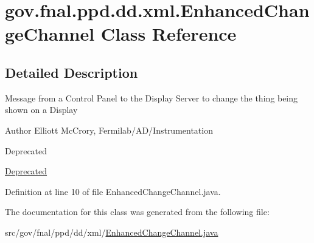 \hypertarget{classgov_1_1fnal_1_1ppd_1_1dd_1_1xml_1_1EnhancedChangeChannel}{\section{gov.\-fnal.\-ppd.\-dd.\-xml.\-Enhanced\-Change\-Channel Class Reference}
\label{classgov_1_1fnal_1_1ppd_1_1dd_1_1xml_1_1EnhancedChangeChannel}
}


\subsection{Detailed Description}
Message from a Control Panel to the Display Server to change the thing being shown on a Display

\begin{DoxyAuthor}{Author}
Elliott Mc\-Crory, Fermilab/\-A\-D/\-Instrumentation 
\end{DoxyAuthor}
\begin{DoxyRefDesc}{Deprecated}
\item[\hyperlink{deprecated__deprecated000015}{Deprecated}]\end{DoxyRefDesc}


Definition at line 10 of file Enhanced\-Change\-Channel.\-java.



The documentation for this class was generated from the following file\-:\begin{DoxyCompactItemize}
\item 
src/gov/fnal/ppd/dd/xml/\hyperlink{EnhancedChangeChannel_8java}{Enhanced\-Change\-Channel.\-java}\end{DoxyCompactItemize}

